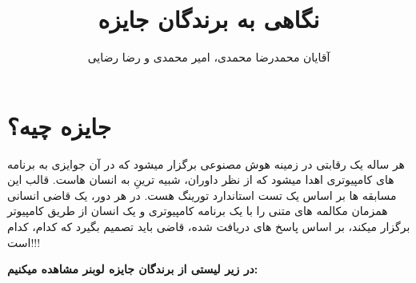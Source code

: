 \documentclass[14pt,a4paper]{report}
\title{نگاهی به برندگان جایزه  \lr{Loebner}}
\author{ آقایان محمدرضا محمدی، امیر محمدی و رضا رضایی}
\begin{document}
	
 	\maketitle
 	\tableofcontents
 	
 	
 	\chapter{جایزه  چیه؟} 
 	هر ساله یک رقابتی در زمینه هوش مصنوعی برگزار میشود که در آن جوایزی به برنامه های کامپیوتری اهدا میشود که از نظر داوران،  شبیه ترینِ به انسان هاست. قالب این مسابقه ها بر اساس یک تست استاندارد تورینگ هست. در هر دور، یک قاضی انسانی همزمان مکالمه های متنی را با یک برنامه کامپیوتری و یک انسان از طریق کامپیوتر برگزار میکند، بر اساس پاسخ های دریافت شده، قاضی باید تصمیم بگیرد که کدام، کدام است!!!
 	
 	\large{\textbf{در زیر لیستی از برندگان جایزه لوبنر مشاهده میکنیم:}}
 	
\end{document}
